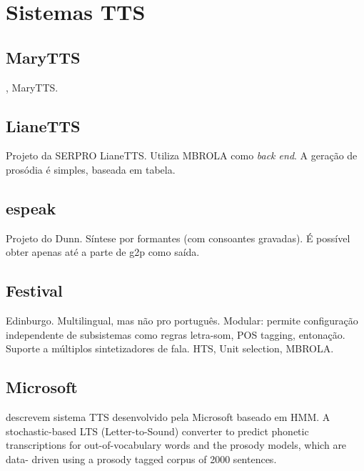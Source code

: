 
\section{Sistemas TTS}
\subsection{MaryTTS}
\cite{couto}, MaryTTS.
\subsection{LianeTTS}
Projeto da SERPRO LianeTTS. Utiliza MBROLA como \emph{back end}. A geração de
prosódia é simples, baseada em tabela.
\subsection{espeak}
Projeto do Dunn. Síntese por formantes (com consoantes gravadas). É possível
obter apenas até a parte de g2p como saída.
\subsection{Festival}
Edinburgo. Multilingual, mas não pro português. Modular: permite configuração
independente de subsistemas como regras letra-som, POS tagging, entonação.
Suporte a múltiplos sintetizadores de fala. HTS, Unit selection, MBROLA.
\subsection{Microsoft}
 descrevem sistema TTS desenvolvido pela Microsoft
baseado em HMM. A stochastic-based LTS (Letter-to-Sound) converter to predict phonetic transcriptions for out-of-vocabulary words and the prosody models, which are data- driven using a prosody tagged corpus of 2000 sentences.
